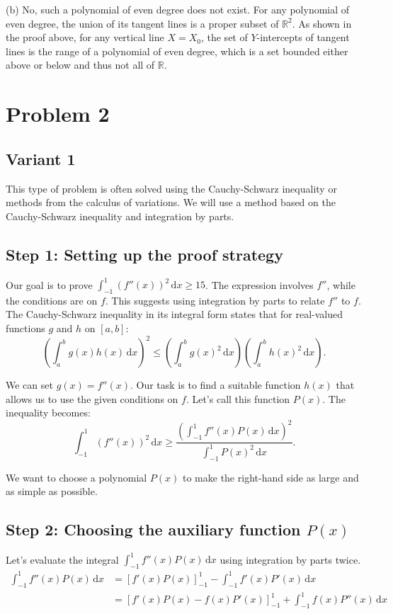 \documentclass[12pt,a4paper]{article}
\theoremstyle{definition}
\begin{document}
(b) No, such a polynomial of even degree does not exist. For any polynomial of even degree, the union of its tangent lines is a proper subset of $\mathbb{R}^2$. As shown in the proof above, for any vertical line $X=X_0$, the set of $Y$-intercepts of tangent lines is the range of a polynomial of even degree, which is a set bounded either above or below and thus not all of $\mathbb{R}$.

\section{Problem 2}

\subsection{Variant 1}
This type of problem is often solved using the Cauchy-Schwarz inequality or methods from the calculus of variations. We will use a method based on the Cauchy-Schwarz inequality and integration by parts.

\subsection*{Step 1: Setting up the proof strategy}
Our goal is to prove $\int_{-1}^{1} (f''(x))^2 \,\mathrm{d}x \geq 15$. The expression involves $f''$, while the conditions are on $f$. This suggests using integration by parts to relate $f''$ to $f$. The Cauchy-Schwarz inequality in its integral form states that for real-valued functions $g$ and $h$ on $[a, b]$:
\[ \left(\int_a^b g(x)h(x)\,\mathrm{d}x\right)^2 \leq \left(\int_a^b g(x)^2\,\mathrm{d}x\right) \left(\int_a^b h(x)^2\,\mathrm{d}x\right). \]

We can set $g(x) = f''(x)$. Our task is to find a suitable function $h(x)$ that allows us to use the given conditions on $f$. Let's call this function $P(x)$. The inequality becomes:
\[ \int_{-1}^{1} (f''(x))^2 \,\mathrm{d}x \geq \frac{\left(\int_{-1}^{1} f''(x)P(x)\,\mathrm{d}x\right)^2}{\int_{-1}^{1} P(x)^2\,\mathrm{d}x}. \]

We want to choose a polynomial $P(x)$ to make the right-hand side as large and as simple as possible.

\subsection*{Step 2: Choosing the auxiliary function $P(x)$}
Let's evaluate the integral $\int_{-1}^{1} f''(x)P(x)\,\mathrm{d}x$ using integration by parts twice.
\begin{align}
\int_{-1}^{1} f''(x)P(x)\,\mathrm{d}x &= \left[f'(x)P(x)\right]_{-1}^{1} - \int_{-1}^{1} f'(x)P'(x)\,\mathrm{d}x \nonumber \\
&= \left[f'(x)P(x) - f(x)P'(x)\right]_{-1}^{1} + \int_{-1}^{1} f(x)P''(x)\,\mathrm{d}x \label{eq:1}
\end{align}
\end{document}
